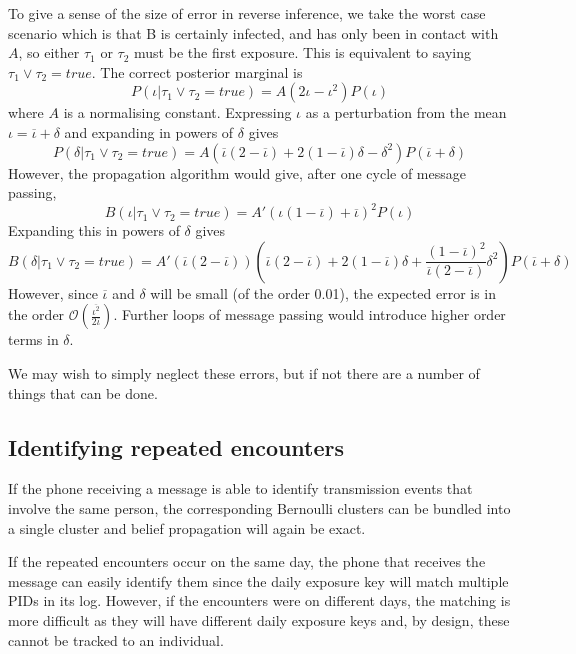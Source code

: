 \documentclass{article}
\begin{document}
To give a sense of the size of error in reverse inference, we take the worst case scenario which is that B is certainly infected, and has only been in contact with $A$, so either $\tau_1$ or $\tau_2$ must be the first exposure. This is equivalent to saying $\tau_1 \vee \tau_2 = true$. The correct posterior marginal is
\[
P(\iota | \tau_1 \vee \tau_2 = true) = A\left(2\iota - \iota^2\right)P(\iota)
\]
where $A$ is a normalising constant. Expressing $\iota$ as a perturbation from the mean $\iota = \overline{\iota} + \delta$ and expanding in powers of $\delta$ gives
\[
P(\delta | \tau_1 \vee \tau_2 = true) = A\left(\overline{\iota}(2 - \overline{\iota}) + 2(1-\overline{\iota})\delta - \delta^2\right)P(\overline{\iota}+\delta)
\]
 However, the propagation algorithm would give, after one cycle of message passing, 
\[
B(\iota | \tau_1 \vee \tau_2 = true) = A' (\iota(1 - \overline\iota) + \overline{\iota})^2P(\iota)
\]
Expanding this in powers of $\delta$ gives
\[
B(\delta | \tau_1 \vee \tau_2 = true) = A'(\overline{\iota}(2 - \overline{\iota})) \left(
\overline{\iota}(2 - \overline{\iota}) +
2(1-\overline{\iota})\delta +
\frac{(1-\overline{\iota})^2}{\overline{\iota}(2 - \overline{\iota})}\delta^2
\right)P(\overline{\iota}+\delta)
\]
However, since $\overline{\iota}$ and $\delta$ will be small (of the order 0.01\cite{luo2020modes}), the expected error is in the order $\mathcal{O}(\frac{\overline{\iota^2}}{2\overline{\iota}})$. Further loops of message passing would introduce higher order terms in $\delta$.

We may wish to simply neglect these errors, but if not there are a number of things that can be done.


\subsection{Identifying repeated encounters}

If the phone receiving a message is able to identify transmission events that involve the same person, the corresponding Bernoulli clusters can be bundled into a single cluster and belief propagation will again be exact.

If the repeated encounters occur on the same day, the phone that receives the message can easily identify them since the daily exposure key will match multiple PIDs in its log. However, if the encounters were on different days, the matching is more difficult as they will have different daily exposure keys and, by design, these cannot be tracked to an individual.
\end{document}
